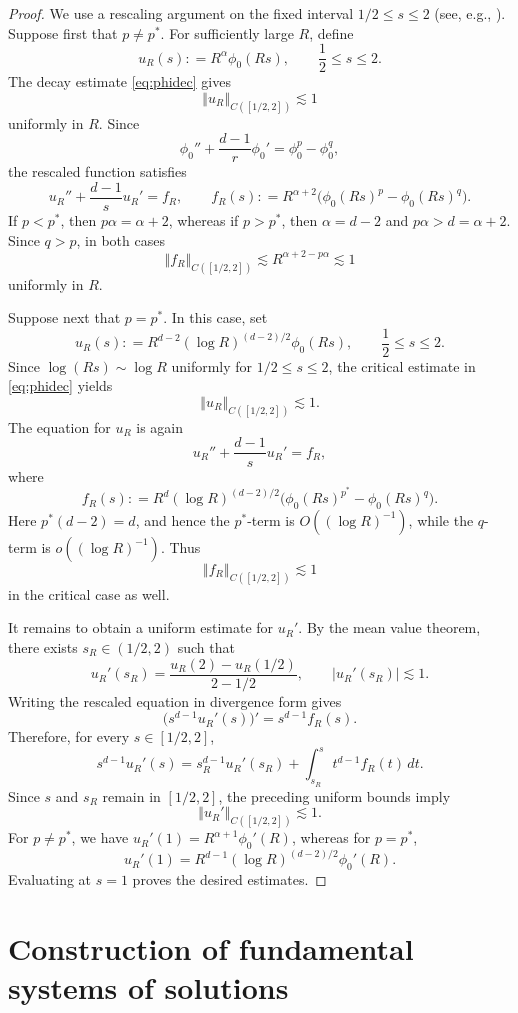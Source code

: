 \documentclass[12pt, a4paper, reqno]{amsart}
\numberwithin{equation}{section}
\theoremstyle{definition}
\theoremstyle{remark}
\def\norm[#1]{{\left\Vert #1 \right\Vert}}
\def\abs[#1]{{\left\vert #1 \right\vert}}
\newcommand{\ce}{\mathrel{\mathop:}=}
\begin{document}
\begin{proof}
We use a rescaling argument on the fixed interval $1/2\le s\le2$ (see, e.g., \cite[Proposition 2.3]{L93}).
Suppose first that $p\ne p^*$. For sufficiently large $R$, define
\[
  u_R(s)\ce R^\alpha\phi_0(Rs),
  \qquad \frac12\le s\le2.
\]
The decay estimate \eqref{eq:phidec} gives
\[
  \norm[u_R]_{C([1/2,2])}\lesssim1
\]
uniformly in $R$. Since
\[
  \phi_0''+\frac{d-1}{r}\phi_0'
  =\phi_0^p-\phi_0^q,
\]
the rescaled function satisfies
\[
  u_R''+\frac{d-1}{s}u_R'=f_R,
  \qquad
  f_R(s)\ce R^{\alpha+2}
  \bigl(\phi_0(Rs)^p-\phi_0(Rs)^q\bigr).
\]
If $p<p^*$, then $p\alpha=\alpha+2$, whereas if $p>p^*$,
then $\alpha=d-2$ and $p\alpha>d=\alpha+2$. Since $q>p$, in both
cases
\[
  \norm[f_R]_{C([1/2,2])}\lesssim R^{\alpha+2-p\alpha}\lesssim1
\]
uniformly in $R$.

Suppose next that $p=p^*$. In this case, set
\[
  u_R(s)
  \ce R^{d-2}(\log R)^{(d-2)/2}\phi_0(Rs),
  \qquad \frac12\le s\le2.
\]
Since $\log(Rs)\sim\log R$ uniformly for $1/2\le s\le2$, the critical
estimate in \eqref{eq:phidec} yields
\[
  \norm[u_R]_{C([1/2,2])}\lesssim1.
\]
The equation for $u_R$ is again
\[
  u_R''+\frac{d-1}{s}u_R'=f_R,
\]
where
\[
  f_R(s)
  \ce R^d(\log R)^{(d-2)/2}
  \bigl(\phi_0(Rs)^{p^*}-\phi_0(Rs)^q\bigr).
\]
Here $p^*(d-2)=d$, and hence the $p^*$-term is
$O((\log R)^{-1})$, while the $q$-term is $o((\log R)^{-1})$. Thus
\[
  \norm[f_R]_{C([1/2,2])}\lesssim1
\]
in the critical case as well.

It remains to obtain a uniform estimate for $u_R'$. By the mean value
theorem, there exists $s_R\in(1/2,2)$ such that
\[
  u_R'(s_R)
  =\frac{u_R(2)-u_R(1/2)}{2-1/2},
  \qquad
  \abs[u_R'(s_R)]\lesssim1.
\]
Writing the rescaled equation in divergence form gives
\[
  \bigl(s^{d-1}u_R'(s)\bigr)'=s^{d-1}f_R(s).
\]
Therefore, for every $s\in[1/2,2]$,
\[
  s^{d-1}u_R'(s)
  =s_R^{d-1}u_R'(s_R)
   +\int_{s_R}^s t^{d-1}f_R(t)\,dt.
\]
Since $s$ and $s_R$ remain in $[1/2,2]$, the preceding uniform bounds
imply
\[
  \norm[u_R']_{C([1/2,2])}\lesssim1.
\]
For $p\ne p^*$, we have
$u_R'(1)=R^{\alpha+1}\phi_0'(R)$, whereas for $p=p^*$,
\[
  u_R'(1)
  =R^{d-1}(\log R)^{(d-2)/2}\phi_0'(R).
\]
Evaluating at $s=1$ proves the desired estimates.
\end{proof}








\section{Construction of fundamental systems of solutions}
\label{sec:3}
\end{document}
